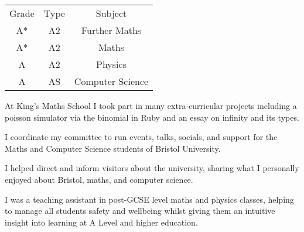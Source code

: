 \documentclass[10pt,a4paper,ragged2e,table]{altacv}
\begin{document}
\noindent
\begin{minipage}[c]{0.6\linewidth}

  \renewcommand{\arraystretch}{1.5}
  \begin{tabular}{ c c c }
    \rowcolor{F_LPink1} Grade & Type & Subject \\
    \rowcolor{F_LPink2} A* & A2 & Further Maths \\
    \rowcolor{F_LPink2} A* & A2 & Maths \\
    \rowcolor{F_LPink2} A & A2 & Physics \\
    \rowcolor{F_LPink2} A & AS & Computer Science
  \end{tabular}

\end{minipage}
\begin{minipage}[c]{0.3\linewidth}

  At King's Maths School I took part in many 
  extra-curricular projects including a poisson 
  simulator via the binomial in Ruby and an essay on infinity 
  and its types.

\end{minipage}


I coordinate my committee to run events, talks, socials, and support for the
Maths and Computer Science students of Bristol University.

\divider

I helped direct and inform visitors about the university, sharing what
I personally enjoyed about Bristol, maths, and computer science.

\divider

I was a teaching assistant in post-GCSE level maths and physics classes,
helping to manage all students safety and wellbeing whilst giving
them an intuitive insight into learning at A Level and higher education.

\clearpage

\end{document}
